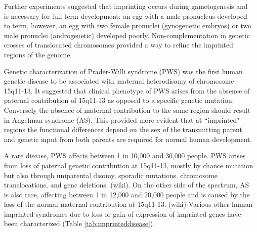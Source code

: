 Further experiments suggested that imprinting occurs during gametogenesis and is necessary for full term development; an egg with a male pronucleus developed to term, however, an egg with two female pronuclei (gynogenetic embryos) or two male pronuclei (androgenetic) developed poorly\cite{Surani1984,McGrath:1984ky}. Non-complementation in genetic crosses of translocated chromosomes provided a way to refine the imprinted regions of the genome\cite{Cattanach:1985hu}. 

Genetic characterization of Prader-Willi syndrome (PWS) was the first human genetic disease to be associated with maternal heterodisomy of chromosome 15q11-13\cite{Nicholls:vh}. It suggested that  clinical phenotype of PWS arises from the absence of paternal contribution of 15q11-13 as opposed to a specific genetic mutation. Conversely the absence of maternal contribution to the same region should result in Angelman syndrome (AS)\cite{Nicholls:vh,Reik:1989el}. This provided more evident that at ``imprinted" regions the functional differences depend on the sex of the transmitting parent and genetic input from both parents are required for normal human development\cite{Nicholls:vh}.

A rare disease, PWS affects between 1 in 10,000 and 30,000 people. PWS arises from loss of paternal genetic contribution at 15q11-13, mostly by chance mutation but also through uniparental disomy, sporadic mutations, chromosome translocations, and gene deletions. (wiki). On the other side of the spectrum, AS is also rare, affecting between 1 in 12,000 and 20,000 people and is caused by the loss of the normal maternal contribution at 15q11-13. (wiki) Various other human imprinted syndromes due to loss or gain of expression of imprinted genes have been characterized (Table \ref{tab:imprinteddisease}). \cite{Peters2014}


